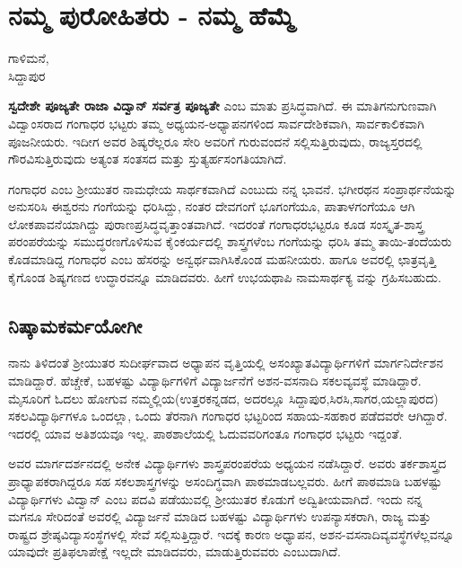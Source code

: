 \chapter{ನಮ್ಮ ಪುರೋಹಿತರು - ನಮ್ಮ ಹೆಮ್ಮೆ}

\begin{center}
\smallskip

ಗಾಳಿಮನೆ,\\ 
ಸಿದ್ದಾಪುರ	
\end{center}

\textbf{ಸ್ವದೇಶೇ ಪೂಜ್ಯತೇ ರಾಜಾ ವಿದ್ವಾನ್ ಸರ್ವತ್ರ ಪೂಜ್ಯತೇ} ಎಂಬ ಮಾತು ಪ್ರಸಿದ್ಧವಾಗಿದೆ. ಈ ಮಾತಿಗನುಗುಣವಾಗಿ ವಿದ್ವಾಂಸರಾದ ಗಂಗಾಧರ ಭಟ್ಟರು ತಮ್ಮ ಅಧ್ಯಯನ-ಅಧ್ಯಾಪನಗಳಿಂದ ಸಾರ್ವದೇಶಿಕವಾಗಿ, ಸಾರ್ವಕಾಲಿಕವಾಗಿ ಪೂಜನೀಯರು. ಇದೀಗ ಅವರ ಶಿಷ್ಯರೆಲ್ಲರೂ ಸೇರಿ ಅವರಿಗೆ ಗುರುವಂದನೆ ಸಲ್ಲಿಸುತ್ತಿರುವುದು, ರಾಜ್ಯಸ್ತರದಲ್ಲಿ ಗೌರವಿಸುತ್ತಿರುವುದು ಅತ್ಯಂತ ಸಂತಸದ ಮತ್ತು ಸ್ತುತ್ಯರ್ಹಸಂಗತಿಯಾಗಿದೆ. 

ಗಂಗಾಧರ ಎಂಬ ಶ್ರೀಯುತರ ನಾಮಧೇಯ ಸಾರ್ಥಕವಾಗಿದೆ ಎಂಬುದು ನನ್ನ ಭಾವನೆ. ಭಗೀರಥನ ಸಂಪ್ರಾರ್ಥನೆಯನ್ನು ಅನುಸರಿಸಿ ಈಶ್ವರನು ಗಂಗೆಯನ್ನು ಧರಿಸಿದ್ದು, ನಂತರ  ದೇವಗಂಗೆ ಭೂಗಂಗೆಯೂ, ಪಾತಾಳಗಂಗೆಯೂ ಆಗಿ ಲೋಕಪಾವನೆಯಾಗಿದ್ದು ಪುರಾಣಪ್ರಸಿದ್ಧವೃತ್ತಾಂತವಾಗಿದೆ. ಇದರಂತೆ ಗಂಗಾಧರಭಟ್ಟರೂ ಕೂಡ ಸಂಸ್ಕೃತ-ಶಾಸ್ತ್ರ ಪರಂಪರೆಯನ್ನು ಸಮುದ್ಧರಣಗೊಳಿಸುವ ಕೈಂಕರ್ಯದಲ್ಲಿ ಶಾಸ್ತ್ರಗಳೆಂಬ ಗಂಗೆಯನ್ನು ಧರಿಸಿ ತಮ್ಮ ತಾಯಿ-ತಂದೆಯರು ಕೊಡಮಾಡಿದ್ದ ಗಂಗಾಧರ ಎಂಬ ಹೆಸರನ್ನು ಅನ್ವರ್ಥವಾಗಿಸಿಕೊಂಡ ಮಹನೀಯರು. ಹಾಗೂ ಅವರಲ್ಲಿ ಛಾತ್ರವೃತ್ತಿ ಕೈಗೊಂಡ ಶಿಷ್ಯಗಣದ ಉದ್ಧಾರವನ್ನೂ ಮಾಡಿದವರು. ಹೀಗೆ ಉಭಯಥಾಪಿ ನಾಮಸಾರ್ಥಕ್ಯ ವನ್ನು ಗ್ರಹಿಸಬಹುದು. 

\section*{ನಿಷ್ಕಾಮಕರ್ಮಯೋಗೀ} 

ನಾನು ತಿಳಿದಂತೆ ಶ್ರೀಯುತರ ಸುದೀರ್ಘವಾದ ಅಧ್ಯಾಪನ ವೃತ್ತಿಯಲ್ಲಿ ಅಸಂಖ್ಯಾತವಿದ್ಯಾರ್ಥಿಗಳಿಗೆ ಮಾರ್ಗನಿರ್ದೇಶನ ಮಾಡಿದ್ದಾರೆ. ಹೆಚ್ಚೇಕೆ, ಬಹಳಷ್ಟು ವಿದ್ಯಾರ್ಥಿಗಳಿಗೆ ವಿದ್ಯಾರ್ಜನೆಗೆ ಅಶನ-ವಸನಾದಿ ಸಕಲವ್ಯವಸ್ಥೆ ಮಾಡಿದ್ದಾರೆ. ಮೈಸೂರಿಗೆ ಓದಲು ಹೋಗುವ ನಮ್ಮಲ್ಲಿಯ(ಉತ್ತರಕನ್ನಡದ, ಅದರಲ್ಲೂ ಸಿದ್ದಾಪುರ,ಸಿರಸಿ,ಸಾಗರ,ಯಲ್ಲಾಪುರದ) ಸಕಲವಿದ್ಯಾರ್ಥಿಗಳೂ ಒಂದಲ್ಲಾ, ಒಂದು ತೆರನಾಗಿ ಗಂಗಾಧರ ಭಟ್ಟರಿಂದ ಸಹಾಯ-ಸಹಕಾರ ಪಡೆದವರೇ ಆಗಿದ್ದಾರೆ. ಇದರಲ್ಲಿ ಯಾವ ಅತಿಶಯವೂ ಇಲ್ಲ. ಪಾಠಶಾಲೆಯಲ್ಲಿ ಓದುವವರಿಗಂತೂ ಗಂಗಾಧರ ಭಟ್ಟರು  ಇದ್ದಂತೆ.  

ಅವರ ಮಾರ್ಗದರ್ಶನದಲ್ಲಿ ಅನೇಕ ವಿದ್ಯಾರ್ಥಿಗಳು ಶಾಸ್ತ್ರಪರಂಪರೆಯ ಅಧ್ಯಯನ ನಡೆಸಿದ್ದಾರೆ. ಅವರು ತರ್ಕಶಾಸ್ತ್ರದ ಪ್ರಾಧ್ಯಾಪಕರಾಗಿದ್ದರೂ ಸಹ ಸಕಲಶಾಸ್ತ್ರಗಳನ್ನು ಅಸಂದಿಗ್ಧವಾಗಿ  ಪಾಠಮಾಡಬಲ್ಲವರು. ಹೀಗೆ ಪಾಠಮಾಡಿ ಬಹಳಷ್ಟು ವಿದ್ಯಾರ್ಥಿಗಳು ವಿದ್ವಾನ್ ಎಂಬ ಪದವಿ ಪಡೆಯುವಲ್ಲಿ ಶ್ರೀಯುತರ ಕೊಡುಗೆ ಅದ್ವಿತೀಯವಾಗಿದೆ. ಇಂದು ನನ್ನ ಮಗನೂ ಸೇರಿದಂತೆ ಅವರಲ್ಲಿ ವಿದ್ಯಾರ್ಜನೆ ಮಾಡಿದ ಬಹಳಷ್ಟು ವಿದ್ಯಾರ್ಥಿಗಳು ಉಪನ್ಯಾಸಕರಾಗಿ,  ರಾಜ್ಯ ಮತ್ತು ರಾಷ್ಟ್ರದ ಶ್ರೇಷ್ಠವಿದ್ಯಾಸಂಸ್ಥೆಗಳಲ್ಲಿ ಸೇವೆ ಸಲ್ಲಿಸುತ್ತಿದ್ದಾರೆ. ಇದಕ್ಕೆ ಕಾರಣ ಅಧ್ಯಾಪನ, ಅಶನ-ವಸನಾದಿವ್ಯವಸ್ಥೆಗಳೆಲ್ಲವನ್ನೂ ಯಾವುದೇ ಪ್ರತಿಫಲಾಪೇಕ್ಷೆ ಇಲ್ಲದೇ ಮಾಡಿದವರು, ಮಾಡುತ್ತಿರುವವರು ಎಂಬುದಾಗಿದೆ. 


